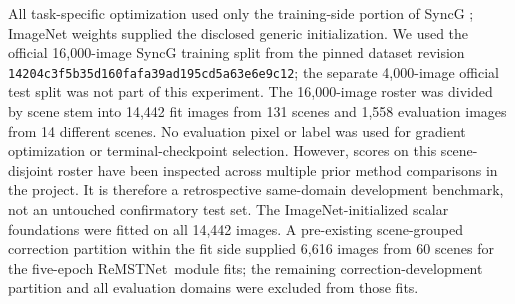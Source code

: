 \documentclass[electronics,article,submit,oneauthor]{Definitions/mdpi}
\newcommand{\modelname}{ReMSTNet}
\begin{document}
All task-specific optimization used only the training-side portion of SyncG \cite{deng2026syncg}; ImageNet weights supplied the disclosed generic initialization. We used the official 16,000-image SyncG training split from the pinned dataset revision \texttt{14204c3f5b35d160fafa\allowbreak39ad195cd5a63e6e9\allowbreak{}c12}; the separate 4,000-image official test split was not part of this experiment. The 16,000-image roster was divided by scene stem into 14,442 fit images from 131 scenes and 1,558 evaluation images from 14 different scenes. No evaluation pixel or label was used for gradient optimization or terminal-checkpoint selection. However, scores on this scene-disjoint roster have been inspected across multiple prior method comparisons in the project. It is therefore a retrospective same-domain development benchmark, not an untouched confirmatory test set. The ImageNet-initialized scalar foundations were fitted on all 14,442 images. A pre-existing scene-grouped correction partition within the fit side supplied 6,616 images from 60 scenes for the five-epoch \modelname\ module fits; the remaining correction-development partition and all evaluation domains were excluded from those fits.
\end{document}
